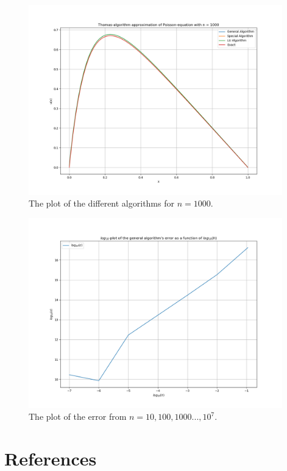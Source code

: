 \documentclass{article}
\begin{document}
\begin{figure}[ht]
	\centering
	\includegraphics[width = 11cm]{program/data1000.png}
	\caption{The plot of the different algorithms for $n = 1000$. }
  \label{fig:data1000png}
\end{figure}

\begin{figure}[ht]
	\centering
	\includegraphics[width = 11cm]{program/error.png}
	\caption{The plot of the error from $n = 10, 100, 1000 ... , 10^7$. }
  \label{fig:errorpng}
\end{figure}



\clearpage

\vspace{1cm}

\section{References} \label{sec:References}
\end{document}
